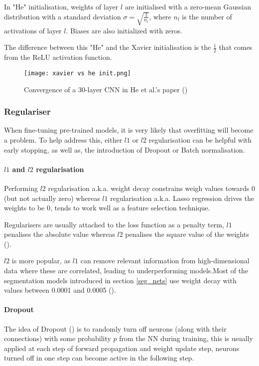 In "He" initialisation, weights of layer $l$ are initialised with a zero-mean Gaussian distribution with a standard deviation  $\sigma =\sqrt{\frac{2}{n_l}}$, where $n_l$ is the number of activations of layer $l$. Biases are also initialized with zeros. 

The difference between this "He" and the Xavier initialisation  is the $\frac{1}{2}$ that comes from the \gls{ReLU} activation function.

\begin{figure}[hbt!]
    \centering
    \texttt{[image: xavier vs he init.png]}
    \caption{Convergence of a 30-layer \gls{CNN} in He et al.'s paper (\cite{He_2015_ICCV})}
    \label{fig_he_xavier}
\end{figure}
\subsubsection{Regulariser} \label{regulariser}
When fine-tuning pre-trained models, it is very likely that overfitting will become a problem. To help address this, either $l1$  or $l2$ regularisation can be helpful with early stopping, as well as, the introduction of Dropout or Batch normalisation.
\paragraph{$l1$ and $l2$ regularisation}
Performing $l2$ regularisation \gls{a.k.a.} weight decay constrains weigh values towards 0 (but not actually zero) whereas $l1$  regularisation \gls{a.k.a.} Lasso regression drives the weights to be $0$, tends to work well as a feature selection technique. 

Regularisers are usually attached to the loss function as a penalty term, $l1$ penalises the absolute value whereas $l2$ penalises the square value of the weights (\cite{shanmugamani2018deep}). 

$l2$  is more popular, as $l1$  can remove relevant information from high-dimensional data where these are correlated, leading to underperforming models.Most of the segmentation models introduced in section \ref{seg_nets} use weight decay with values between 0.0001 and 0.0005 (\cite{sultana2020106062}).
\paragraph{Dropout} 
The idea of Dropout (\cite{JMLR:v15:srivastava14a}) is to randomly turn off neurons (along with their connections) with some probability $p$ from the \gls{NN} during training, this is usually applied at each step of forward propagation and weight update step, neurons turned off in one step can become active in the following step.

